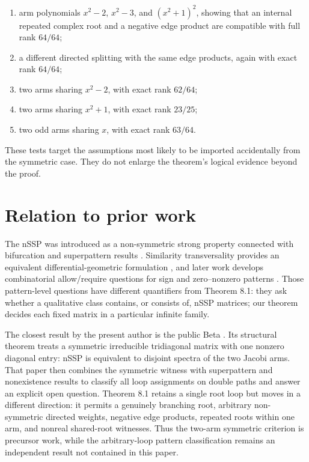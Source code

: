 \documentclass[11pt]{article}
\theoremstyle{remark}
\begin{document}
\begin{enumerate}
\item arm polynomials $x^2-2$, $x^2-3$, and $(x^2+1)^2$, showing that an internal repeated complex root and a negative edge product are compatible with full rank $64/64$;
\item a different directed splitting with the same edge products, again with exact rank $64/64$;
\item two arms sharing $x^2-2$, with exact rank $62/64$;
\item two arms sharing $x^2+1$, with exact rank $23/25$;
\item two odd arms sharing $x$, with exact rank $63/64$.

\end{enumerate}

These tests target the assumptions most likely to be imported accidentally from the symmetric case. They do not enlarge the theorem's logical evidence beyond the proof.

\section{Relation to prior work}

The nSSP was introduced as a non-symmetric strong property connected with bifurcation and superpattern results \cite{ref3}. Similarity transversality provides an equivalent differential-geometric formulation \cite{ref1}, and later work develops combinatorial allow/require questions for sign and zero--nonzero patterns \cite{ref6,ref7}. Those pattern-level questions have different quantifiers from Theorem 8.1: they ask whether a qualitative class contains, or consists of, nSSP matrices; our theorem decides each fixed matrix in a particular infinite family.

The closest result by the present author is the public Beta \cite{ref11}. Its structural theorem treats a symmetric irreducible tridiagonal matrix with one nonzero diagonal entry: nSSP is equivalent to disjoint spectra of the two Jacobi arms. That paper then combines the symmetric witness with superpattern and nonexistence results to classify all loop assignments on double paths and answer an explicit open question. Theorem 8.1 retains a single root loop but moves in a different direction: it permits a genuinely branching root, arbitrary non-symmetric directed weights, negative edge products, repeated roots within one arm, and nonreal shared-root witnesses. Thus the two-arm symmetric criterion is precursor work, while the arbitrary-loop pattern classification remains an independent result not contained in this paper.
\end{document}
